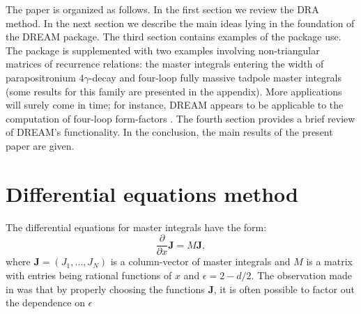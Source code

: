 \documentclass[sort&compress]{elsarticle}
\begin{document}
The paper is organized as follows.
In the first section we review the DRA method.
In the next section we describe the main ideas lying in the foundation of the DREAM package.
The third section contains examples of the package use.
The package is supplemented with two examples involving non-triangular matrices of recurrence relations:
the master integrals entering the width of parapositronium 4$\gamma$-decay and four-loop fully massive tadpole master integrals (some results for this family are presented in the appendix).
More applications will surely come in time;
for instance, DREAM appears to be applicable to the computation of four-loop form-factors \cite{HennSmirnovSteinhauser:4loop-form-factors,HennLeeSmirnovSteinhauser:4loop-form-factors,LeeSmirnovSteinhauser:4loop-form-factors-nf2,ManteuffelSchabinger:4loop-form-factors-nf3}.
The fourth section provides a brief review of DREAM's functionality.
In the conclusion, the main results of the present paper are given.

\section{Differential equations method}

The differential equations for master integrals have the form:
\begin{equation}
	\frac{\partial}{\partial x} \mathbf{J} = {M} \mathbf{J},
\end{equation}
where $\mathbf{J} = (J_1, \ldots, J_N)$ is a column-vector of master integrals and $M$ is a matrix with entries being rational functions of $x$ and $\epsilon=2-d/2$. The observation made in \cite{Henn2013} was that by properly choosing the functions $\mathbf{J}$, it is often possible to factor out the dependence on $\epsilon$
\end{document}
